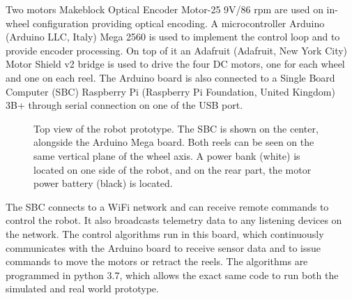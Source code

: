 \documentclass[journal]{IEEEtran}
\begin{document}
Two motors Makeblock Optical Encoder Motor-25 9V/86 rpm are used on in-wheel configuration providing optical encoding.  A microcontroller Arduino (Arduino LLC, Italy) Mega 2560 is used to implement the control loop and to provide encoder processing.  On top of it an Adafruit (Adafruit, New York City) Motor Shield v2 bridge is used to drive the four DC motors, one for each wheel and one on each reel.   The Arduino board is also connected to a Single Board Computer (SBC) Raspberry Pi (Raspberry Pi Foundation, United Kingdom) 3B+ through serial connection on one of the USB port.

\begin{figure}[!t]
\centering
{}
\caption{Top view of the robot prototype.  The SBC is shown on the center, alongside the Arduino Mega board.  Both reels can be seen on the same vertical plane of the wheel axis. A power bank (white) is located on one side of the robot, and on the rear part, the motor power battery (black) is located.}
\label{fig:alpibot2}
\end{figure}

The SBC connects to a WiFi network and can receive remote commands to control the robot. It also broadcasts telemetry data to any listening devices on the network. The control algorithms run in this board, which continuously communicates with the Arduino board to receive sensor data and to issue commands to move the motors or retract the reels.   The algorithms are programmed in python 3.7, which allows the exact same code to run both the simulated and real world prototype.  
\end{document}
